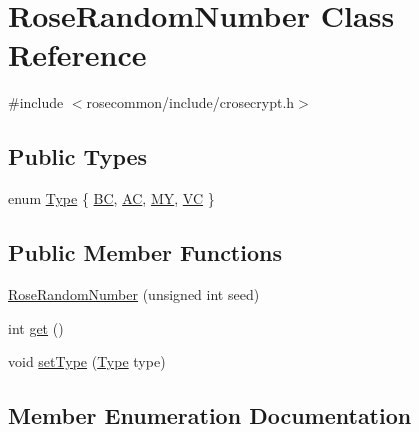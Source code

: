 \hypertarget{classRoseRandomNumber}{}\section{Rose\+Random\+Number Class Reference}
\label{classRoseRandomNumber}


{\ttfamily \#include $<$rosecommon/include/crosecrypt.\+h$>$}

\subsection*{Public Types}
\begin{DoxyCompactItemize}
\item 
enum \hyperlink{classRoseRandomNumber_a846d1df212a8a9d84793dbf8fba1028c}{Type} \{ \hyperlink{classRoseRandomNumber_a846d1df212a8a9d84793dbf8fba1028ca5096f23ff87e3d031a6a998a3183b4fd}{BC}, 
\hyperlink{classRoseRandomNumber_a846d1df212a8a9d84793dbf8fba1028ca31a086f27fb75c780828c65ab2d6f9da}{AC}, 
\hyperlink{classRoseRandomNumber_a846d1df212a8a9d84793dbf8fba1028ca74038be0a6be018451edaf0984b3164e}{MY}, 
\hyperlink{classRoseRandomNumber_a846d1df212a8a9d84793dbf8fba1028ca0476934d333bd403a6a61e8368dd4ad8}{VC}
 \}
\end{DoxyCompactItemize}
\subsection*{Public Member Functions}
\begin{DoxyCompactItemize}
\item 
\hyperlink{classRoseRandomNumber_a07c15a31e01006dd0e3bd786a7848d56}{Rose\+Random\+Number} (unsigned int seed)
\item 
int \hyperlink{classRoseRandomNumber_a26e81722f9594d079d570bcce0a66888}{get} ()
\item 
void \hyperlink{classRoseRandomNumber_aae1c071af323479245b3acf66417cdfe}{set\+Type} (\hyperlink{classRoseRandomNumber_a846d1df212a8a9d84793dbf8fba1028c}{Type} type)
\end{DoxyCompactItemize}


\subsection{Member Enumeration Documentation}

